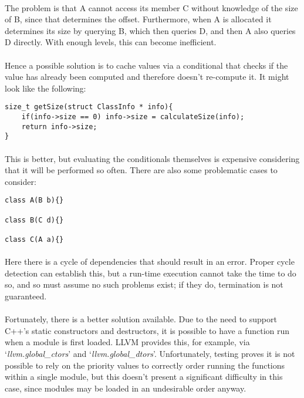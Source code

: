 \documentclass{article}
\begin{document}
\paragraph{}
The problem is that A cannot access its member C without knowledge of the size of B, since that determines the offset. Furthermore, when A is allocated it determines its size by querying B, which then queries D, and then A also queries D directly. With enough levels, this can become inefficient.

\paragraph{}
Hence a possible solution is to cache values via a conditional that checks if the value has already been computed and therefore doesn't re-compute it. It might look like the following:

\begin{lstlisting}
size_t getSize(struct ClassInfo * info){
	if(info->size == 0) info->size = calculateSize(info);
	return info->size;
}
\end{lstlisting}

\paragraph{}
This is better, but evaluating the conditionals themselves is expensive considering that it will be performed so often. There are also some problematic cases to consider:

\begin{lstlisting}
class A(B b){}

class B(C d){}

class C(A a){}
\end{lstlisting}

\paragraph{}
Here there is a cycle of dependencies that should result in an error. Proper cycle detection can establish this, but a run-time execution cannot take the time to do so, and so must assume no such problems exist; if they do, termination is not guaranteed.

\paragraph{}
Fortunately, there is a better solution available. Due to the need to support C++'s static constructors and destructors, it is possible to have a function run when a module is first loaded. LLVM provides this, for example, via `\emph{llvm.global\_ctors}' and `\emph{llvm.global\_dtors}'. Unfortunately, testing proves it is not possible to rely on the priority values to correctly order running the functions within a single module, but this doesn't present a significant difficulty in this case, since modules may be loaded in an undesirable order anyway.
\end{document}
